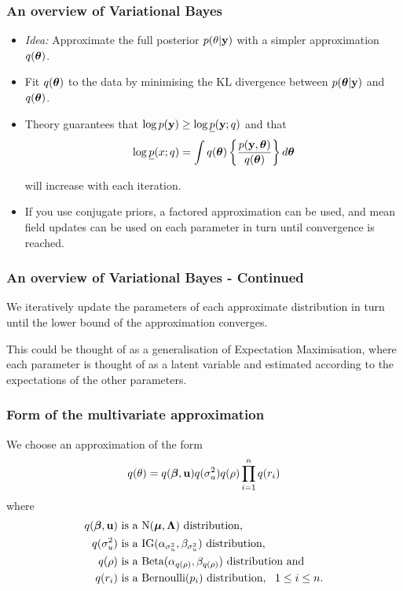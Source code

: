 \documentclass{beamer}
\begin{document}
\begin{frame}
	\frametitle{An overview of Variational Bayes}
	\begin{itemize}
		\item \emph{Idea:} Approximate the full posterior $p(\theta|{\bf y})$ with a simpler approximation $q({\boldsymbol \theta})$.
		      		      		      		      		      
		\item Fit $q({\boldsymbol \theta})$ to the data by minimising the KL divergence between $p({\boldsymbol \theta}|{\bf y})$ and $q({\boldsymbol \theta})$.
		      		      		      		      		      
		\item Theory guarantees that $\log p({\bf y})\ge 
		      \log \underline{p}({\bf y};q)$ and that 
		      $$
		      \log \underline{p}(x;q) = \int q({\boldsymbol \theta}) \left\{ \frac{p({\bf y},{\boldsymbol \theta})}{q({\boldsymbol \theta})} \right\} d {\boldsymbol \theta}
		      $$ 
		      		      		      		      		      
		      \noindent will
		      increase with each iteration.
		      		      		      		      		      
		\item If you use conjugate priors, a factored approximation can be used, and mean field updates can be used on
		      each parameter in turn until convergence is reached.
	\end{itemize}
\end{frame}

\begin{frame}
	\frametitle{An overview of Variational Bayes - Continued}
	We iteratively update the parameters of each approximate distribution
	in turn until the lower bound of the approximation converges.
					
	\bigskip 
	This could be thought of as a generalisation of Expectation Maximisation, where each parameter is thought of as a latent
	variable and estimated according to the expectations of the other parameters.
\end{frame}


\begin{frame}
	\frametitle{Form of the multivariate approximation}
	We choose an approximation of the form
	$$
	q(\theta) = q({\boldsymbol \beta}, {\bf u}) q(\sigma_u^2) q(\rho) \prod_{i=1}^n q(r_i)
	$$
	where
	\begin{align*}
		q({\boldsymbol \beta}, {\bf u}) & \text{ is a } \text{N}({\boldsymbol \mu}, {\boldsymbol \Lambda}) \text{ distribution},                                  \\
		q(\sigma_u^2)  & \text{ is a } \text{IG}(\alpha_{\sigma_u^2}, \beta_{\sigma_u^2}) \text{ distribution},        \\
		q(\rho)        & \text{ is a } \text{Beta}(\alpha_{q(\rho)}, \beta_{q(\rho)}) \text{ distribution} \text{ and} \\
		q(r_i)         & \text{ is a } \text{Bernoulli}(p_i) \text{ distribution}, \ \ 1 \leq i \leq n.                
	\end{align*}
\end{frame}
\end{document}
